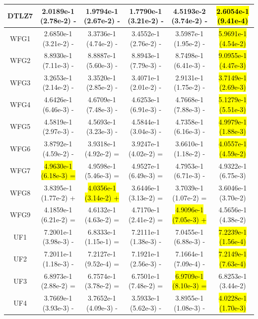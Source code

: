 \documentclass[journal]{IEEEtran}
\begin{document}
\begin{table}[tbp]
\begin{tabular}{cccccc}
    DTLZ7   & 2.0189e-1 (2.78e-2) -      & 1.9794e-1 (2.67e-2) -      & 1.7790e-1 (3.21e-2) -      & 4.5193e-2 (3.74e-2) -      & \hl{2.6054e-1 (9.41e-4)} \\
    \hline
    WFG1    & 2.6850e-1 (3.21e-2) -      & 3.3736e-1 (4.74e-2) -      & 3.4552e-1 (2.76e-2) -      & 3.5987e-1 (1.95e-2) -      & \hl{5.9691e-1 (4.54e-2)} \\
    WFG2    & 8.8930e-1 (7.11e-3) -      & 8.8887e-1 (5.60e-3) -      & 8.8943e-1 (7.79e-3) -      & 8.7498e-1 (6.41e-3) -      & \hl{9.0955e-1 (4.47e-3)} \\
    WFG3    & 3.2653e-1 (2.14e-2) -      & 3.3520e-1 (2.85e-2) -      & 3.4071e-1 (2.01e-2) -      & 2.9131e-1 (1.75e-2) -      & \hl{3.7149e-1 (2.69e-3)} \\
    WFG4    & 4.6426e-1 (6.46e-3) -      & 4.6709e-1 (7.48e-3) -      & 4.6253e-1 (6.91e-3) -      & 4.7668e-1 (7.88e-3) -      & \hl{5.1279e-1 (5.51e-3)} \\
    WFG5    & 4.5819e-1 (2.97e-3) -      & 4.5693e-1 (3.23e-3) -      & 4.5844e-1 (3.04e-3) -      & 4.7358e-1 (6.16e-3) -      & \hl{4.9979e-1 (1.88e-3)} \\
    WFG6    & 3.8792e-1 (4.59e-2) -      & 3.9318e-1 (4.92e-2) =      & 3.9247e-1 (4.02e-2) =      & 3.6610e-1 (1.18e-2) -      & \hl{4.0557e-1 (4.59e-2)} \\
    WFG7    & \hl{4.9630e-1 (6.18e-3) =} & 4.9598e-1 (5.46e-3) =      & 4.9527e-1 (6.49e-3) =      & 4.7953e-1 (6.71e-3) -      & 4.9322e-1 (6.75e-3)      \\
    WFG8    & 3.8395e-1 (1.77e-2) +      & \hl{4.0356e-1 (3.14e-2) +} & 3.6446e-1 (3.13e-2) =      & 3.7039e-1 (1.07e-2) =      & 3.6046e-1 (3.70e-2)      \\
    WFG9    & 4.1859e-1 (6.21e-2) =      & 4.6132e-1 (4.63e-2) =      & 4.7170e-1 (2.41e-2) =      & \hl{4.9096e-1 (7.05e-3) +} & 4.5656e-1 (4.38e-2)      \\
    \hline
    UF1     & 7.2001e-1 (3.98e-3) -      & 6.8333e-1 (1.15e-1) =      & 7.2111e-1 (1.38e-3) -      & 7.0455e-1 (6.88e-3) -      & \hl{7.2239e-1 (1.56e-4)} \\
    UF2     & 7.2011e-1 (1.18e-3) -      & 7.2127e-1 (9.52e-4) =      & 7.1921e-1 (2.56e-3) -      & 7.1664e-1 (7.09e-4) -      & \hl{7.2149e-1 (7.63e-4)} \\
    UF3     & 6.8973e-1 (2.88e-2) =      & 6.7574e-1 (3.78e-2) =      & 6.7501e-1 (7.48e-2) =      & \hl{6.9709e-1 (8.10e-3) =} & 6.8253e-1 (3.44e-2)      \\
    UF4     & 3.7669e-1 (3.93e-3) -      & 3.7652e-1 (4.09e-3) -      & 3.5933e-1 (5.62e-3) -      & 3.8955e-1 (1.08e-3) -      & \hl{4.0228e-1 (1.70e-3)} \\

\end{tabular}
\end{table}
\end{document}
